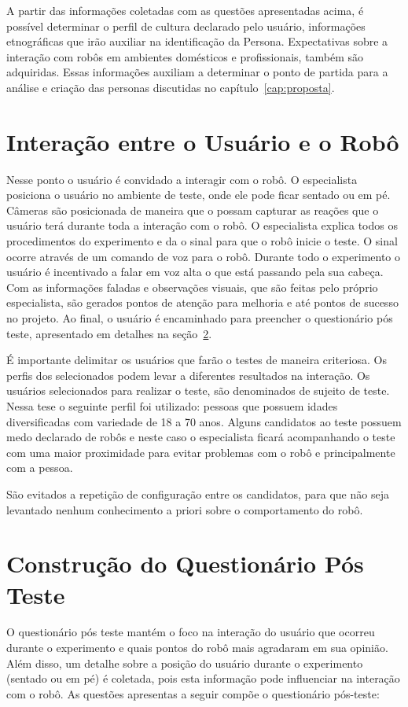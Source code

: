 A partir das informações coletadas com as questões apresentadas acima, é possível determinar o perfil de cultura declarado pelo usuário, informações etnográficas que irão auxiliar na identificação da Persona. Expectativas sobre a interação com robôs em ambientes domésticos e profissionais, também são adquiridas. Essas informações auxiliam a determinar o ponto de partida para a análise e criação das personas discutidas no capítulo~\ref{cap:proposta}.

\section{Interação entre o Usuário e o Robô}
\label{sec:experimentointeracao}
Nesse ponto o usuário é convidado a interagir com o robô. O especialista posiciona o usuário no ambiente de teste, onde ele pode ficar sentado ou em pé. Câmeras são posicionada de maneira que o possam capturar as reações que o usuário terá durante toda a interação com o robô. O especialista explica todos os procedimentos do experimento e da o sinal para que o robô inicie o teste. O sinal ocorre através de um comando de voz para o robô. Durante todo o experimento o usuário é incentivado a falar em voz alta o que está passando pela sua cabeça. Com as informações faladas e observações visuais, que são feitas pelo próprio especialista, são gerados pontos de atenção para melhoria e até pontos de sucesso no projeto. Ao final, o usuário é encaminhado para preencher o questionário pós teste, apresentado em detalhes na seção~\ref{sec:questionarioposteste}.

É importante delimitar os usuários que farão o testes de maneira criteriosa. Os perfis dos selecionados podem levar a diferentes resultados na interação. Os usuários selecionados para realizar o teste, são denominados de sujeito de teste. Nessa tese o seguinte perfil foi utilizado: pessoas que possuem idades diversificadas com variedade de 18 a 70 anos. Alguns candidatos ao teste possuem medo declarado de robôs e neste caso o especialista ficará acompanhando o teste com uma maior proximidade para evitar problemas com o robô e principalmente com a pessoa.

São evitados a repetição de configuração entre os candidatos, para que não seja levantado nenhum conhecimento a priori sobre o comportamento do robô.

\section{Construção do Questionário Pós Teste}
\label{sec:questionarioposteste}
O questionário pós teste mantém o foco na interação do usuário que ocorreu durante o experimento e quais pontos do robô mais agradaram em sua opinião. Além disso, um detalhe sobre a posição do usuário durante o experimento (sentado ou em pé) é coletada, pois esta informação pode influenciar na interação com o robô. As questões apresentas a seguir compõe o questionário pós-teste:

